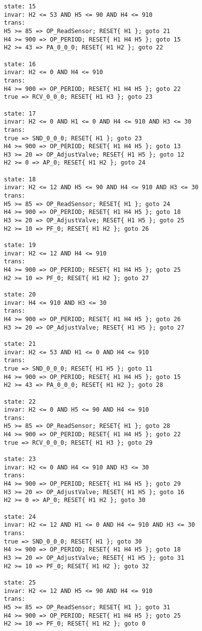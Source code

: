 {\begin{verbatim}
state: 15
invar: H2 <= 53 AND H5 <= 90 AND H4 <= 910
trans: 
H5 >= 85 => OP_ReadSensor; RESET{ H1 }; goto 21
H4 >= 900 => OP_PERIOD; RESET{ H1 H4 H5 }; goto 15
H2 >= 43 => PA_0_0_0; RESET{ H1 H2 }; goto 22

state: 16
invar: H2 <= 0 AND H4 <= 910
trans: 
H4 >= 900 => OP_PERIOD; RESET{ H1 H4 H5 }; goto 22
true => RCV_0_0_0; RESET{ H1 H3 }; goto 23

state: 17
invar: H2 <= 0 AND H1 <= 0 AND H4 <= 910 AND H3 <= 30
trans: 
true => SND_0_0_0; RESET{ H1 }; goto 23
H4 >= 900 => OP_PERIOD; RESET{ H1 H4 H5 }; goto 13
H3 >= 20 => OP_AdjustValve; RESET{ H1 H5 }; goto 12
H2 >= 0 => AP_0; RESET{ H1 H2 }; goto 24

state: 18
invar: H2 <= 12 AND H5 <= 90 AND H4 <= 910 AND H3 <= 30
trans: 
H5 >= 85 => OP_ReadSensor; RESET{ H1 }; goto 24
H4 >= 900 => OP_PERIOD; RESET{ H1 H4 H5 }; goto 18
H3 >= 20 => OP_AdjustValve; RESET{ H1 H5 }; goto 25
H2 >= 10 => PF_0; RESET{ H1 H2 }; goto 26

state: 19
invar: H2 <= 12 AND H4 <= 910
trans: 
H4 >= 900 => OP_PERIOD; RESET{ H1 H4 H5 }; goto 25
H2 >= 10 => PF_0; RESET{ H1 H2 }; goto 27

state: 20
invar: H4 <= 910 AND H3 <= 30
trans: 
H4 >= 900 => OP_PERIOD; RESET{ H1 H4 H5 }; goto 26
H3 >= 20 => OP_AdjustValve; RESET{ H1 H5 }; goto 27

state: 21
invar: H2 <= 53 AND H1 <= 0 AND H4 <= 910
trans: 
true => SND_0_0_0; RESET{ H1 H5 }; goto 11
H4 >= 900 => OP_PERIOD; RESET{ H1 H4 H5 }; goto 15
H2 >= 43 => PA_0_0_0; RESET{ H1 H2 }; goto 28

state: 22
invar: H2 <= 0 AND H5 <= 90 AND H4 <= 910
trans: 
H5 >= 85 => OP_ReadSensor; RESET{ H1 }; goto 28
H4 >= 900 => OP_PERIOD; RESET{ H1 H4 H5 }; goto 22
true => RCV_0_0_0; RESET{ H1 H3 }; goto 29

state: 23
invar: H2 <= 0 AND H4 <= 910 AND H3 <= 30
trans: 
H4 >= 900 => OP_PERIOD; RESET{ H1 H4 H5 }; goto 29
H3 >= 20 => OP_AdjustValve; RESET{ H1 H5 }; goto 16
H2 >= 0 => AP_0; RESET{ H1 H2 }; goto 30

state: 24
invar: H2 <= 12 AND H1 <= 0 AND H4 <= 910 AND H3 <= 30
trans: 
true => SND_0_0_0; RESET{ H1 }; goto 30
H4 >= 900 => OP_PERIOD; RESET{ H1 H4 H5 }; goto 18
H3 >= 20 => OP_AdjustValve; RESET{ H1 H5 }; goto 31
H2 >= 10 => PF_0; RESET{ H1 H2 }; goto 32

state: 25
invar: H2 <= 12 AND H5 <= 90 AND H4 <= 910
trans: 
H5 >= 85 => OP_ReadSensor; RESET{ H1 }; goto 31
H4 >= 900 => OP_PERIOD; RESET{ H1 H4 H5 }; goto 25
H2 >= 10 => PF_0; RESET{ H1 H2 }; goto 0


\end{verbatim}}
